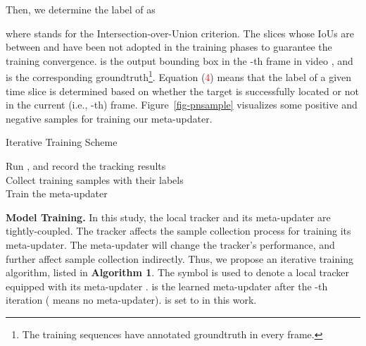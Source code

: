 \documentclass[10pt,twocolumn,letterpaper]{article}
\begin{document}
Then, we determine the label of  as
 \vspace{-1mm}

where  stands for the Intersection-over-Union criterion.
The slices whose IoUs are between  and  have been not adopted in the training
phases to guarantee the training convergence.
 is the output bounding box in the -th frame in video , and
 is the corresponding groundtruth\footnote{The training sequences
have annotated groundtruth in every frame.}.
Equation (\textcolor{red}{4}) means that the label of a given time slice is determined based
on whether the target is successfully located or not in the current (i.e., -th) frame.
Figure~\ref{fig-pnsample} visualizes some positive and negative samples
for training our meta-updater.

\vspace{-2mm}
\begin{algorithm}[h]
\caption{Iterative Training Scheme}
\label{alg:Framwork}
\begin{algorithmic}[h]
\FOR{; ; }
\STATE
Run , and record the tracking results\\
Collect training samples  with their labels \\
Train the meta-updater \\
\ENDFOR
\end{algorithmic}
\end{algorithm}
\vspace{-2mm}

\noindent \textbf{Model Training.} In this study, the local tracker and its meta-updater
are tightly-coupled.
The tracker affects the sample collection process for training its meta-updater.
The meta-updater will change the tracker's performance, and further affect sample
collection indirectly.
Thus, we propose an iterative training algorithm, listed in \textbf{Algorithm 1}.
The symbol 
is used to denote a local tracker equipped with its meta-updater
.
 is the learned meta-updater
after the -th iteration ( means no meta-updater).
 is set to  in this work.

\vspace{-4mm}
\end{document}
